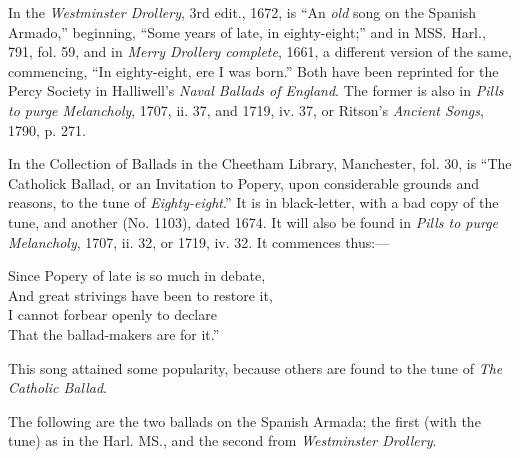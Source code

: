 In the \textit{Westminster Drollery}, 3rd edit., 1672, is “An \textit{old} song on the Spanish
Armado,” beginning, “Some years of late, in eighty-eight;” and in MSS. Harl.,
791, fol. 59, and in \textit{Merry Drollery complete}, 1661, a different version of the same,
commencing, “In eighty-eight, ere I was born.” Both have been reprinted for
the Percy Society in Halliwell’s \textit{Naval Ballads of England}. The former is also
in \textit{Pills to purge Melancholy}, 1707, ii. 37, and 1719, iv. 37, or Ritson’s \textit{Ancient
Songs}, 1790, p. 271.

In the Collection of Ballads in the Cheetham Library, \pagebreak Manchester, fol. 30, is
“The Catholick Ballad, or an Invitation to Popery, upon considerable grounds and
reasons, to the tune of \textit{Eighty-eight}.” It is in black-letter, with a bad copy of the
tune, and another (No. 1103), dated 1674. It will also be found in \textit{Pills to purge
Melancholy}, 1707, ii. 32, or 1719, iv. 32. It commences thus:—
\settowidth{\versewidth}{Since Popery of late is so much in debate,}
\begin{scverse}
\begin{altverse}
Since Popery of late is so much in debate,\\
And great strivings have been to restore it,\\
I cannot forbear openly to declare\\
That the ballad-makers are for it.”
\end{altverse}
\end{scverse}

This song attained some popularity, because others are found to the tune of
\textit{The Catholic Ballad}.

The following are the two ballads on the Spanish Armada; the first (with the
tune) as in the Harl. MS., and the second from \textit{Westminster Drollery}.



